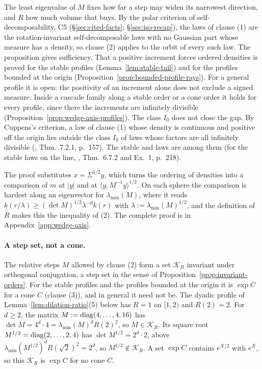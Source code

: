 The least eigenvalue of $M$ fixes how far a step may widen its narrowest direction, and $R$ how much
volume that buys. By the polar criterion of self-decomposability, C5 (\S\ref{sec:cited-facts};
\S\ref{sec:iso-recap}), the laws of clause (1) are the rotation-invariant
self-decomposable laws with no Gaussian part whose \Levy{} measure has a density, so clause (2)
applies to the orbit of every such law. The proposition gives sufficiency. That a positive increment forces ordered densities is proved for the stable
profiles (Lemma~\ref{lem:stable-tail}) and for the profiles bounded at the origin
(Proposition~\ref{prop:bounded-profile-rays}). For a general profile it is open: the positivity of an
increment alone does not exclude a signed \Levy{} measure. Inside a cascade family along a stable order or
a cone order it holds for every profile, since there the increments are infinitely divisible
(Proposition~\ref{prop:wedge-axis-profiles}). The class $I_0$ does not close the gap. By
Cuppens's criterion, a law of clause (1) whose \Levy{} density is continuous and positive off the
origin lies outside the class $I_0$ of laws whose factors are all infinitely divisible
(, Thm.~7.2.1, p.~157). The stable and \Matern{} laws are among them
(for the stable laws on the line, , Thm.~6.7.2 and Ex.~1, p.~218).

The proof substitutes $x = \Sigma^{1/2}y$, which turns the ordering of densities into a comparison of
$m$ at $|y|$ and at $\langle y,M^{-1}y\rangle^{1/2}$. On each sphere the comparison is hardest along an
eigenvector for $\lambda_{\min}(M)$, where it reads $k(r/\lambda) \ge (\det M)^{1/2}\lambda^{-d}k(r)$ with
$\lambda := \lambda_{\min}(M)^{1/2}$, and the definition of $R$ makes this the inequality of (2). The
complete proof is in Appendix~\ref{app:wedge-axis}.

\paragraph{A step set, not a cone.} The relative steps $M$ allowed by clause (2) form a set
$\mathcal K_R$ invariant under orthogonal conjugation, a step set in the sense of
Proposition~\ref{prop:invariant-orders}. For the stable profiles and the profiles bounded at the origin
it is $\exp C$ for a cone $C$ (clause (3)), and in general it need not be. The dyadic profile of
Lemma~\ref{lem:dilation-ratio}(5) below has $R = 1$ on $[1, 2)$ and $R(2) = 2$. For $d \ge 2$, the
matrix $M := \operatorname{diag}(4, \dots, 4, 16)$ has $\det M = 4^d\cdot 4 = \lambda_{\min}(M)^dR(2)^2$, so
$M \in \mathcal K_R$. Its square root $M^{1/2} = \operatorname{diag}(2, \dots, 2, 4)$ has $\det M^{1/2} = 2^d\cdot 2$,
above $\lambda_{\min}(M^{1/2})^dR(\sqrt2)^2 = 2^d$, so $M^{1/2} \notin \mathcal K_R$. A set $\exp C$ contains
$e^{X/2}$ with $e^X$, so this $\mathcal K_R$ is $\exp C$ for no cone $C$.

